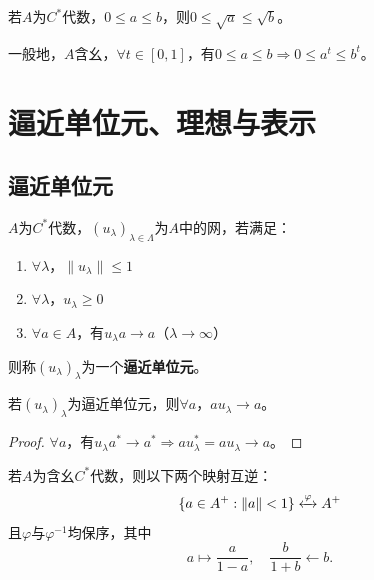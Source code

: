 \documentclass[lang=cn,a4paper,newtx,section]{elegantbook}
\begin{document}
\begin{remark}
  若$A$为$C^*$代数，$0 \leq a \leq b$，则$0 \leq \sqrt{a} \leq \sqrt{b}$。
  
  一般地，$A$含幺，$\forall t \in [0, 1]$，有$0 \leq a \leq b \Rightarrow 0 \leq a^t \leq b^t$。
\end{remark}

\chapter{逼近单位元、理想与表示}

\section{逼近单位元}

\begin{definition}[逼近单位元]
  $A$为$C^*$代数，$(u_\lambda)_{\lambda \in \Lambda}$为$A$中的网，若满足：
  \begin{enumerate}
    \item $\forall \lambda$，$\|u_\lambda\| \leq 1$
    \item $\forall \lambda$，$u_\lambda \geq 0$
    \item $\forall a \in A$，有$u_\lambda a \to a$（$\lambda \to \infty$）
  \end{enumerate}
  则称$(u_\lambda)_\lambda$为一个\textbf{逼近单位元}。
\end{definition}

\begin{remark}
  若$(u_\lambda)_\lambda$为逼近单位元，则$\forall a$，$au_\lambda \to a$。
\end{remark}

\begin{proof}
  $\forall a$，有$u_\lambda a^* \to a^* \Rightarrow au_\lambda^* = au_\lambda \to a$。
\end{proof}

\begin{lemma}\label{lem:order-iso}
  若$A$为含幺$C^*$代数，则以下两个映射互逆：
  \begin{equation*}
    \{a \in A^+ : \|a\| < 1\} \xleftrightarrow{\varphi} A^+
  \end{equation*}
  且$\varphi$与$\varphi^{-1}$均保序，其中
  \begin{equation*}
    a \longmapsto \frac{a}{1 - a}, \quad \frac{b}{1 + b} \longleftarrow b.
  \end{equation*}
\end{lemma}
  
\end{document}
